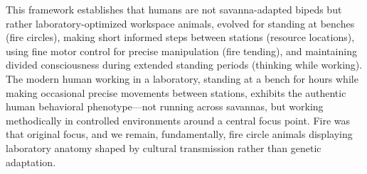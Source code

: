 \documentclass[12pt,a4paper]{article}
\begin{document}
This framework establishes that humans are not savanna-adapted bipeds but rather laboratory-optimized workspace animals, evolved for standing at benches (fire circles), making short informed steps between stations (resource locations), using fine motor control for precise manipulation (fire tending), and maintaining divided consciousness during extended standing periods (thinking while working). The modern human working in a laboratory, standing at a bench for hours while making occasional precise movements between stations, exhibits the authentic human behavioral phenotype—not running across savannas, but working methodically in controlled environments around a central focus point. Fire was that original focus, and we remain, fundamentally, fire circle animals displaying laboratory anatomy shaped by cultural transmission rather than genetic adaptation.



\end{document}
